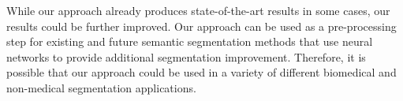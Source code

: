 While our approach already produces state-of-the-art results in some cases, our results could be further improved. 
Our approach can be used as a pre-processing step for 
existing and future semantic segmentation methods that use neural networks to provide additional 
segmentation improvement. Therefore, it is possible that our approach could be used in a variety of 
different biomedical and non-medical segmentation applications.







